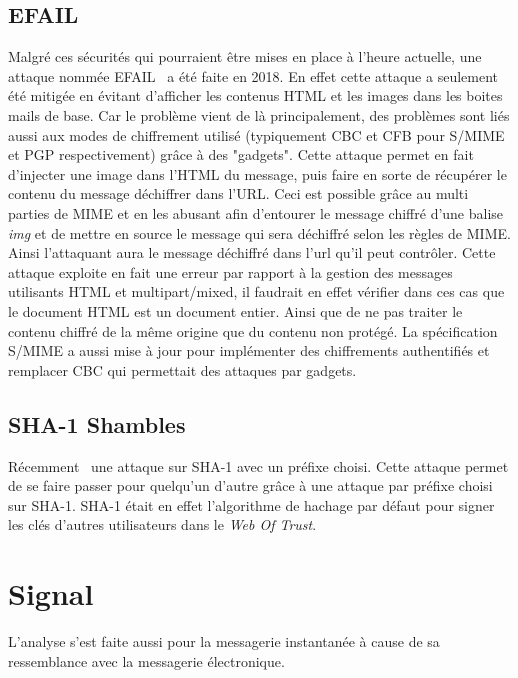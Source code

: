 \subsection{EFAIL}
\label{attacks:EFAIL}
Malgré ces sécurités qui pourraient être mises en place à l’heure actuelle, une attaque nommée EFAIL~\cite{DBLP:conf/uss/PoddebniakD0ISF18} a été faite en 2018. En effet cette attaque a seulement été mitigée en évitant d’afficher les contenus HTML et les images dans les boites mails de base. Car le problème vient de là principalement, des problèmes sont liés aussi aux modes de chiffrement utilisé (typiquement CBC et CFB pour S/MIME et PGP respectivement) grâce à des "gadgets".
Cette attaque permet en fait d'injecter une image dans l'HTML du message, puis faire en sorte de récupérer le contenu du message déchiffrer dans l'URL. Ceci est possible grâce au multi parties de MIME et en les abusant afin d'entourer le message chiffré d'une balise \textit{img} et de mettre en source le message qui sera déchiffré selon les règles de MIME. Ainsi l'attaquant aura le message déchiffré dans l'url qu'il peut contrôler. Cette attaque exploite en fait une erreur par rapport à la gestion des messages utilisants HTML et multipart/mixed, il faudrait en effet vérifier dans ces cas que le document HTML est un document entier. Ainsi que de ne pas traiter le contenu chiffré de la même origine que du contenu non protégé. La spécification~\cite{RFC8551} S/MIME a aussi mise à jour pour implémenter des chiffrements authentifiés et remplacer CBC qui permettait des attaques par gadgets.
\subsection{SHA-1 Shambles}
Récemment~\cite{DBLP:journals/iacr/LeurentP20} une attaque sur SHA-1 avec un préfixe choisi. Cette attaque permet de se faire passer pour quelqu'un d'autre grâce à une attaque par préfixe choisi sur SHA-1. SHA-1 était en effet l'algorithme de hachage par défaut pour signer les clés d'autres utilisateurs dans le \textit{Web Of Trust}.
\section{Signal}
L'analyse s'est faite aussi pour la messagerie instantanée à cause de sa ressemblance avec la messagerie électronique. 
